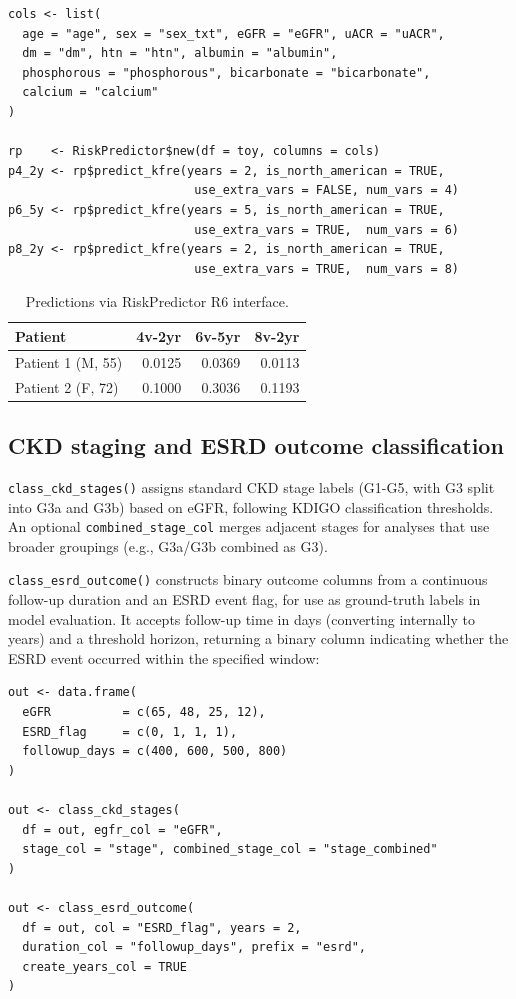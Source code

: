 \begin{verbatim}
cols <- list(
  age = "age", sex = "sex_txt", eGFR = "eGFR", uACR = "uACR",
  dm = "dm", htn = "htn", albumin = "albumin",
  phosphorous = "phosphorous", bicarbonate = "bicarbonate",
  calcium = "calcium"
)

rp    <- RiskPredictor$new(df = toy, columns = cols)
p4_2y <- rp$predict_kfre(years = 2, is_north_american = TRUE,
                          use_extra_vars = FALSE, num_vars = 4)
p6_5y <- rp$predict_kfre(years = 5, is_north_american = TRUE,
                          use_extra_vars = TRUE,  num_vars = 6)
p8_2y <- rp$predict_kfre(years = 2, is_north_american = TRUE,
                          use_extra_vars = TRUE,  num_vars = 8)
\end{verbatim}

\begin{table}

\caption{\label{tab:r6-table}Predictions via RiskPredictor R6 interface.}
\centering
\begin{tabular}[t]{lrrr}
\toprule
Patient & 4v-2yr & 6v-5yr & 8v-2yr\\
\midrule
Patient 1 (M, 55) & 0.0125 & 0.0369 & 0.0113\\
Patient 2 (F, 72) & 0.1000 & 0.3036 & 0.1193\\
\bottomrule
\end{tabular}
\end{table}

\subsection{CKD staging and ESRD outcome classification}\label{ckd-staging-and-esrd-outcome-classification}

\texttt{class\_ckd\_stages()} assigns standard CKD stage labels (G1-G5, with G3 split
into G3a and G3b) based on eGFR, following KDIGO classification thresholds.
An optional \texttt{combined\_stage\_col} merges adjacent stages for analyses that use
broader groupings (e.g., G3a/G3b combined as G3).

\texttt{class\_esrd\_outcome()} constructs binary outcome columns from a continuous
follow-up duration and an ESRD event flag, for use as ground-truth labels in
model evaluation. It accepts follow-up time in days (converting internally to
years) and a threshold horizon, returning a binary column indicating whether
the ESRD event occurred within the specified window:

\begin{verbatim}
out <- data.frame(
  eGFR          = c(65, 48, 25, 12),
  ESRD_flag     = c(0, 1, 1, 1),
  followup_days = c(400, 600, 500, 800)
)

out <- class_ckd_stages(
  df = out, egfr_col = "eGFR",
  stage_col = "stage", combined_stage_col = "stage_combined"
)

out <- class_esrd_outcome(
  df = out, col = "ESRD_flag", years = 2,
  duration_col = "followup_days", prefix = "esrd",
  create_years_col = TRUE
)
\end{verbatim}

